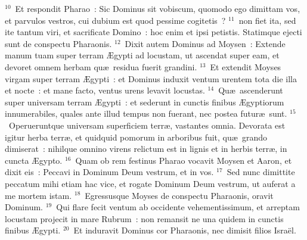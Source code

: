 ${}^{10}$~Et respondit Pharao~: Sic Dominus sit vobiscum, quomodo ego dimittam vos, et parvulos vestros, cui dubium est quod pessime cogitetis~?
${}^{11}$~non fiet ita, sed ite tantum viri, et sacrificate Domino~: hoc enim et ipsi petistis. Statimque ejecti sunt de conspectu Pharaonis.
${}^{12}$~Dixit autem Dominus ad Moysen~: Extende manum tuam super terram \AE gypti ad locustam, ut ascendat super eam, et devoret omnem herbam qu\ae\ residua fuerit grandini.
${}^{13}$~Et extendit Moyses virgam super terram \AE gypti~: et Dominus induxit ventum urentem tota die illa et nocte~: et mane facto, ventus urens levavit locustas.
${}^{14}$~Qu\ae\ ascenderunt super universam terram \AE gypti~: et sederunt in cunctis finibus \AE gyptiorum innumerabiles, quales ante illud tempus non fuerant, nec postea futur\ae\ sunt.
${}^{15}$~Operueruntque universam superficiem terr\ae , vastantes omnia. Devorata est igitur herba terr\ae , et quidquid pomorum in arboribus fuit, qu\ae\ grando dimiserat~: nihilque omnino virens relictum est in lignis et in herbis terr\ae , in cuncta \AE gypto.
${}^{16}$~Quam ob rem festinus Pharao vocavit Moysen et Aaron, et dixit eis~: Peccavi in Dominum Deum vestrum, et in vos.
${}^{17}$~Sed nunc dimittite peccatum mihi etiam hac vice, et rogate Dominum Deum vestrum, ut auferat a me mortem istam.
${}^{18}$~Egressusque Moyses de conspectu Pharaonis, oravit Dominum.
${}^{19}$~Qui flare fecit ventum ab occidente vehementissimum, et arreptam locustam projecit in mare Rubrum~: non remansit ne una quidem in cunctis finibus \AE gypti.
${}^{20}$~Et induravit Dominus cor Pharaonis, nec dimisit filios Isra\"el.


